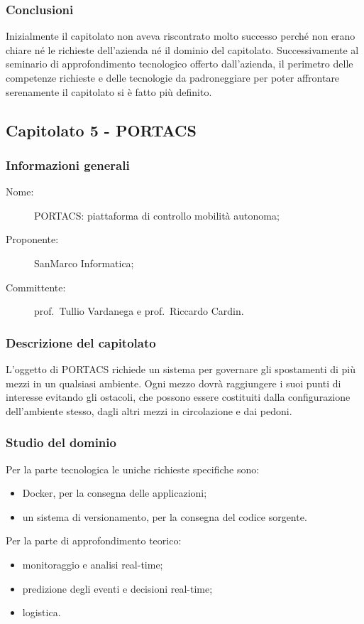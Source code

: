 \subsubsection{Conclusioni}
Inizialmente il capitolato non aveva riscontrato molto successo perché non erano chiare né le richieste dell'azienda né il dominio del capitolato. Successivamente al seminario di approfondimento tecnologico offerto dall'azienda, il perimetro delle competenze richieste e delle tecnologie da padroneggiare per poter affrontare serenamente il capitolato si è fatto più definito.

\subsection{Capitolato 5 - PORTACS}
\subsubsection{Informazioni generali}
\begin{description}
	\item[Nome:] PORTACS: piattaforma di controllo mobilità autonoma;
	\item[Proponente:] SanMarco Informatica;
	\item[Committente:] prof.~Tullio Vardanega e prof.~Riccardo Cardin.
\end{description}
\subsubsection{Descrizione del capitolato}
L'oggetto di PORTACS richiede un sistema per governare gli spostamenti di più mezzi in un qualsiasi ambiente. Ogni mezzo dovrà raggiungere i suoi punti di interesse evitando gli ostacoli, che possono essere costituiti dalla configurazione dell'ambiente stesso, dagli altri mezzi in circolazione e dai pedoni.
\subsubsection{Studio del dominio}
Per la parte tecnologica le uniche richieste specifiche sono:
\begin{itemize}
	\item Docker, per la consegna delle applicazioni;
	\item un sistema di versionamento, per la consegna del codice sorgente.
\end{itemize}

Per la parte di approfondimento teorico:
\begin{itemize}
	\item monitoraggio e analisi real-time;
	\item predizione degli eventi e decisioni real-time;
	\item logistica.
\end{itemize}
